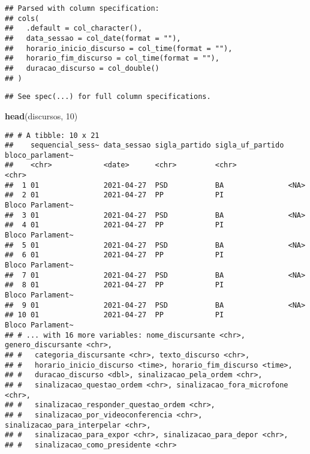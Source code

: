 \documentclass[
]{article}
\newenvironment{Shaded}{\begin{snugshade}}{\end{snugshade}}
\newcommand{\DecValTok}[1]{\textcolor[rgb]{0.00,0.00,0.81}{#1}}
\newcommand{\KeywordTok}[1]{\textcolor[rgb]{0.13,0.29,0.53}{\textbf{#1}}}
\newcommand{\NormalTok}[1]{#1}
\begin{document}
\begin{verbatim}
## Parsed with column specification:
## cols(
##   .default = col_character(),
##   data_sessao = col_date(format = ""),
##   horario_inicio_discurso = col_time(format = ""),
##   horario_fim_discurso = col_time(format = ""),
##   duracao_discurso = col_double()
## )
\end{verbatim}

\begin{verbatim}
## See spec(...) for full column specifications.
\end{verbatim}

\begin{Shaded}
\begin{Highlighting}[]
\KeywordTok{head}\NormalTok{(discursos, }\DecValTok{10}\NormalTok{)}
\end{Highlighting}
\end{Shaded}

\begin{verbatim}
## # A tibble: 10 x 21
##    sequencial_sess~ data_sessao sigla_partido sigla_uf_partido bloco_parlament~
##    <chr>            <date>      <chr>         <chr>            <chr>           
##  1 01               2021-04-27  PSD           BA               <NA>            
##  2 01               2021-04-27  PP            PI               Bloco Parlament~
##  3 01               2021-04-27  PSD           BA               <NA>            
##  4 01               2021-04-27  PP            PI               Bloco Parlament~
##  5 01               2021-04-27  PSD           BA               <NA>            
##  6 01               2021-04-27  PP            PI               Bloco Parlament~
##  7 01               2021-04-27  PSD           BA               <NA>            
##  8 01               2021-04-27  PP            PI               Bloco Parlament~
##  9 01               2021-04-27  PSD           BA               <NA>            
## 10 01               2021-04-27  PP            PI               Bloco Parlament~
## # ... with 16 more variables: nome_discursante <chr>, genero_discursante <chr>,
## #   categoria_discursante <chr>, texto_discurso <chr>,
## #   horario_inicio_discurso <time>, horario_fim_discurso <time>,
## #   duracao_discurso <dbl>, sinalizacao_pela_ordem <chr>,
## #   sinalizacao_questao_ordem <chr>, sinalizacao_fora_microfone <chr>,
## #   sinalizacao_responder_questao_ordem <chr>,
## #   sinalizacao_por_videoconferencia <chr>, sinalizacao_para_interpelar <chr>,
## #   sinalizacao_para_expor <chr>, sinalizacao_para_depor <chr>,
## #   sinalizacao_como_presidente <chr>
\end{verbatim}
\end{document}
